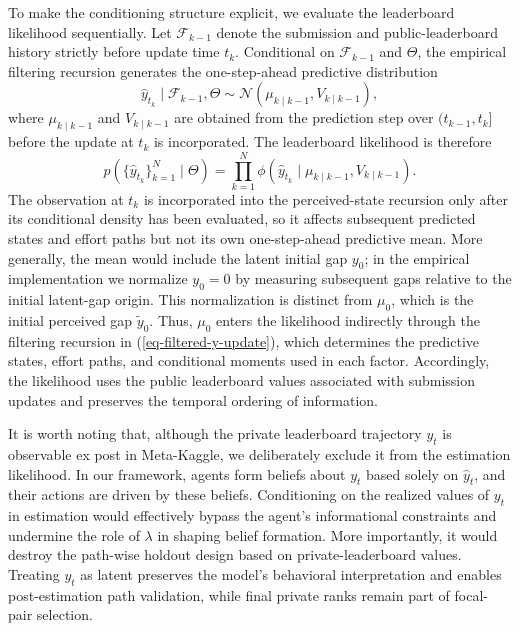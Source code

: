 \documentclass[mnsc]{informs3}
\begin{document}
To make the conditioning structure explicit, we evaluate the leaderboard likelihood sequentially. Let $\mathcal F_{k-1}$ denote the submission and public-leaderboard history strictly before update time $t_k$. Conditional on $\mathcal F_{k-1}$ and $\Theta$, the empirical filtering recursion generates the one-step-ahead predictive distribution
\[
\hat y_{t_k}\mid\mathcal F_{k-1},\Theta
\sim
\mathcal N\!\left(\mu_{k\mid k-1},V_{k\mid k-1}\right),
\]
where $\mu_{k\mid k-1}$ and $V_{k\mid k-1}$ are obtained from the prediction step over $(t_{k-1},t_k]$ before the update at $t_k$ is incorporated. The leaderboard likelihood is therefore
\begin{equation}\label{eq-obs_gap-prob}
p\left(\{\hat{y}_{t_k}\}_{k=1}^N\mid\Theta\right)
=
\prod_{k=1}^N
\phi\left(\hat y_{t_k}\mid\mu_{k\mid k-1},V_{k\mid k-1}\right).
\end{equation}
The observation at $t_k$ is incorporated into the perceived-state recursion only after its conditional density has been evaluated, so it affects subsequent predicted states and effort paths but not its own one-step-ahead predictive mean.
More generally, the mean would include the latent initial gap $y_0$; in the empirical implementation we normalize $y_0=0$ by measuring subsequent gaps relative to the initial latent-gap origin.
This normalization is distinct from $\mu_0$, which is the initial perceived gap $\tilde y_0$.
Thus, $\mu_0$ enters the likelihood indirectly through the filtering recursion in (\ref{eq-filtered-y-update}), which determines the predictive states, effort paths, and conditional moments used in each factor.
Accordingly, the likelihood uses the public leaderboard values associated with submission updates and preserves the temporal ordering of information.

It is worth noting that, although the private leaderboard trajectory $y_t$ is observable ex post in Meta-Kaggle, we deliberately exclude it from the estimation likelihood.
In our framework, agents form beliefs about $y_t$ based solely on $\hat{y}_t$, and their actions are driven by these beliefs.
Conditioning on the realized values of $y_t$ in estimation would effectively bypass the agent’s informational constraints and undermine the role of $\lambda$ in shaping belief formation.
More importantly, it would destroy the path-wise holdout design based on private-leaderboard values.
Treating $y_t$ as latent preserves the model’s behavioral interpretation and enables post-estimation path validation, while final private ranks remain part of focal-pair selection.
\end{document}
